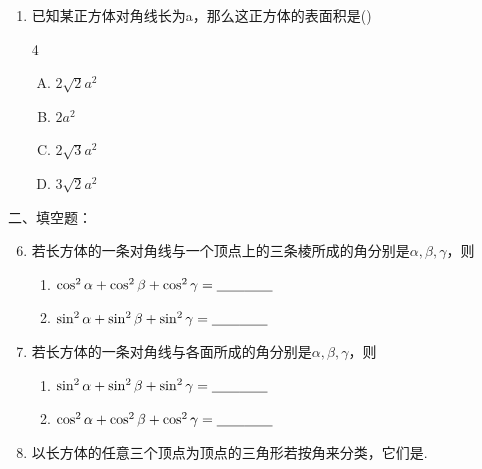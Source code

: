 \begin{enumerate}
\begin{minipage}{.37\textwidth}
\begin{tikzpicture}[]
    \end{tikzpicture}
    \end{minipage}

\begin{multicols}{2}
\begin{enumerate}[(A)]
    \item $\cot\alpha=\frac{2}{\sqrt{5}}$
    \item $\cos\alpha=\frac{2}{\sqrt{5}}$
    \item $\sin\alpha=\frac{1}{\sqrt{5}}$
    \item $\tan\alpha=2\sqrt{2}$
\end{enumerate}
\end{multicols}

\item 已知某正方体对角线长为a，那么这正方体的表面积是\hfill    (\qquad)
\begin{multicols}{4}
    \begin{enumerate}[(A)]
\item $2\sqrt{2}a^2$
\item $2a^2$
\item $2\sqrt{3}a^2$
\item $3\sqrt{2}a^2$
\end{enumerate}
\end{multicols}
\end{enumerate}

二、填空题：
\begin{enumerate}\setcounter{enumi}{5}
\item 若长方体的一条对角线与一个顶点上的三条棱所成的角分别是$\alpha,\beta,\gamma$，则
\begin{enumerate}[(1)]
\item $\cos^2\alpha+\cos^2\beta+\cos^2\gamma=\underline{\qquad}\underline{\qquad}$
\item $\sin^2\alpha+\sin^2\beta+\sin^2\gamma=\underline{\qquad}\underline{\qquad}$
\end{enumerate}

\item 若长方体的一条对角线与各面所成的角分别是$\alpha,\beta,\gamma$，则
\begin{enumerate}[(1)]
\item $\sin^2\alpha+\sin^2\beta+\sin^2\gamma=\underline{\qquad}\underline{\qquad}$
\item $\cos^2\alpha+\cos^2\beta+\cos^2\gamma=\underline{\qquad}\underline{\qquad}$
\end{enumerate}

\item 以长方体的任意三个顶点为顶点的三角形若按角来分类，它们是\blank\blank.
\end{enumerate}


